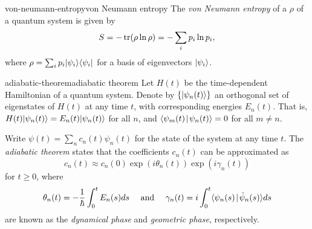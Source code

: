 \begin{topic}{von-neumann-entropy}{von Neumann entropy}
    The \emph{von Neumann entropy} of a  $\rho$ of a quantum system is given by
    \[ S = - \operatorname{tr} ( \rho \ln \rho ) = - \sum_i p_i \ln p_i , \]
    where $\rho = \sum_i p_i |\psi_i\rangle \langle\psi_i|$ for a basis of eigenvectors $|\psi_i\rangle$.
\end{topic}




\begin{topic}{adiabatic-theorem}{adiabatic theorem}
    Let $H(t)$ be the time-dependent Hamiltonian of a quantum system. Denote by $\{ |\psi_n(t)\rangle \}$ an orthogonal set of eigenstates of $H(t)$ at any time $t$, with corresponding energies $E_n(t)$. That is, $H(t) |\psi_n(t)\rangle = E_n(t) |\psi_n(t)\rangle$ for all $n$, and $\langle\psi_m(t)\!\mid\!\psi_n(t)\rangle = 0$ for all $m \ne n$.

    Write $\psi(t) = \sum_{n} c_n(t) \psi_n(t)$ for the state of the system at any time $t$. The \emph{adiabatic theorem} states that the coefficients $c_n(t)$ can be approximated as
    \[ c_n(t) \approx c_n(0) \exp(i \theta_n(t)) \exp(i \gamma_n(t)) \]
    for $t \ge 0$, where
    \[ \theta_n(t) = - \frac{1}{\hbar} \int_{0}^{t} E_n(s) ds \quad \textup{ and } \quad \gamma_n(t) = i \int_{0}^{t} \langle\psi_n(s)\!\mid\!\dot{\psi}_n(s)\rangle ds \]
    are known as the \textit{dynamical phase} and \textit{geometric phase}, respectively.
\end{topic}

